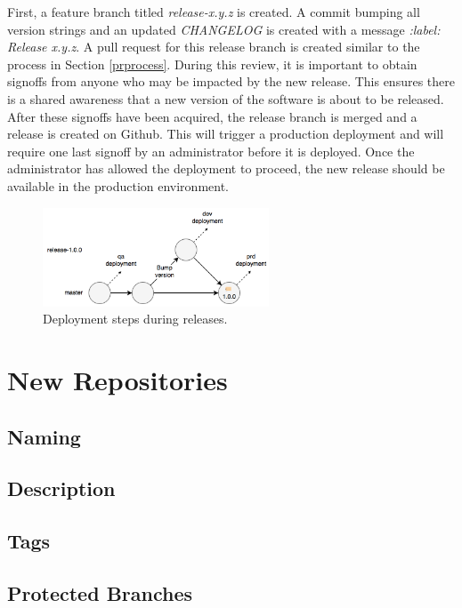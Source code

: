 \documentclass[a4paper,12pt,titlepage]{scrartcl}
\begin{document}
   	First, a feature branch titled {\em release-x.y.z} is created.
   	A commit bumping all version strings and an updated {\em CHANGELOG} is created with a message {\em :label: Release x.y.z}.
   	A pull request for this release branch is created similar to the process in Section \ref{prprocess}.
   	During this review, it is important to obtain signoffs from anyone who may be impacted by the new release.
   	This ensures there is a shared awareness that a new version of the software is about to be released.
   	After these signoffs have been acquired, the release branch is merged and a release is created on Github.
   	This will trigger a production deployment and will require one last signoff by an administrator before it is deployed.
   	Once the administrator has allowed the deployment to proceed, the new release should be available in the production environment.
   	
   	\begin{figure}[t]
  			\centering
    			\includegraphics[width=0.6\textwidth]{images/gitflow-Page-2.png}
    			\caption{Deployment steps during releases.}
    			\label{fig:releaseflow}
   	\end{figure}
	
	\section{New Repositories}
	
	\subsection{Naming}
	
	\subsection{Description}
	
	\subsection{Tags}
	
	\subsection{Protected Branches}
	
\end{document}
